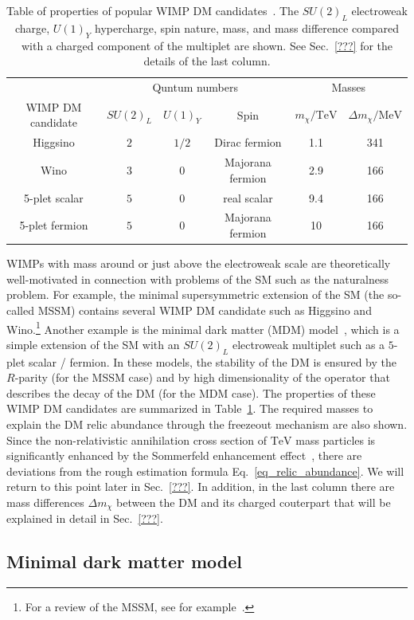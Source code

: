 \documentclass[12pt,twoside,book]{article}
\begin{document}
\begin{table}
 \centering
 \begin{tabular}{c|ccc|cc}
  & \multicolumn{3}{c|}{Quntum numbers} & \multicolumn{2}{c}{Masses}\\
  WIMP DM candidate & $SU(2)_L$ & $U(1)_Y$ & Spin & $m_\chi / \mathrm{TeV}$ &
  $\Delta m_\chi / \mathrm{MeV}$ \\
  \hline
  Higgsino & $2$ & $1/2$ & Dirac fermion & 1.1 & 341 \\
  Wino & $3$ & $0$ & Majorana fermion & 2.9 & 166 \\
  5-plet scalar & $5$ & $0$ & real scalar & 9.4 & 166 \\
  5-plet fermion & $5$ & $0$ & Majorana fermion & 10 & 166
 \end{tabular}
 \caption{Table of properties of popular WIMP DM
 candidates~\cite{Farina:2013mla, ArkaniHamed:2006mb, Hisano:2006nn,
 Cirelli:2007xd, Moroi:2013sla, Beneke:2016ync}.  The $SU(2)_L$
 electroweak charge, $U(1)_Y$ hypercharge, spin nature, mass, and mass
 difference compared with a charged component of the multiplet are
 shown.  See Sec.~\ref{???}   for the details of the last
 column.}  \label{tab_WIMP_property}
\end{table}

WIMPs with mass around or just above the electroweak scale are
theoretically well-motivated in connection with problems of the SM such
as the naturalness problem.  For example, the minimal supersymmetric
extension of the SM (the so-called MSSM) contains several WIMP DM
candidate such as Higgsino and Wino.\footnote{
For a review of the MSSM, see for example~\cite{Martin:1997ns}.
}
Another example is the minimal dark matter (MDM)
model~\cite{Cirelli:2005uq, Cirelli:2007xd, Cirelli:2009uv}, which is a
simple extension of the SM with an $SU(2)_L$ electroweak multiplet such
as a $5$-plet scalar / fermion.  In these models, the stability of the
DM is ensured by the $R$-parity (for the MSSM case) and by high
dimensionality of the operator that describes the decay of the DM (for
the MDM case).  The properties of these WIMP DM candidates are
summarized in Table~\ref{tab_WIMP_property}.  The required masses to
explain the DM relic abundance through the freezeout mechanism are also
shown.  Since the non-relativistic annihilation cross section of
$\mathrm{TeV}$ mass particles is significantly enhanced by the
Sommerfeld enhancement effect~\cite{Hisano:2004ds, Hisano:2006nn}, there
are deviations from the rough estimation formula
Eq.~\eqref{eq_relic_abundance}.  We will return to this point later in
Sec.~\ref{???}.    In addition, in the last column there
are mass differences $\Delta m_\chi$ between the DM and its charged
couterpart that will be explained in detail in Sec.~\ref{???}.

\subsection{Minimal dark matter model}





\end{document}
